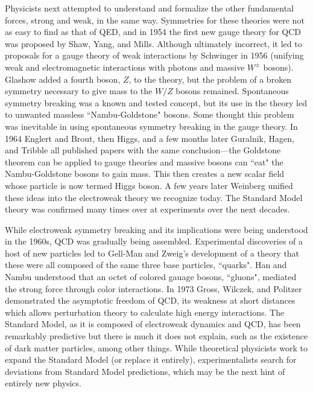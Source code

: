Physicists next attempted to understand and formalize the other fundamental forces, strong and weak, in the same way. Symmetries for these theories were not as easy to find as that of QED, and in 1954 the first new gauge theory for QCD was proposed by Shaw, Yang, and Mills. Although ultimately incorrect, it led to proposals for a gauge theory of weak interactions by Schwinger in 1956 (unifying weak and electromagnetic interactions with photons and massive $W^\pm$ bosons). Glashow added a fourth boson, $Z$, to the theory, but the problem of a broken symmetry necessary to give mass to the $W/Z$ bosons remained. Spontaneous symmetry breaking was a known and tested concept, but its use in the theory led to unwanted massless ``Nambu-Goldstone" bosons. Some thought this problem was inevitable in using spontaneous symmetry breaking in the gauge theory. In 1964 Englert and Brout, then Higgs, and a few months later Guralnik, Hagen, and Tribble all published papers with the same conclusion---the Goldstone theorem can be applied to gauge theories and massive bosons can ``eat" the Nambu-Goldstone bosons to gain mass. This then creates a new scalar field whose particle is now termed Higgs boson. A few years later Weinberg unified these ideas into the electroweak theory we recognize today. The Standard Model theory was confirmed many times over at experiments over the next decades. 

While electroweak symmetry breaking and its implications were being understood in the 1960s, QCD was gradually being assembled. Experimental discoveries of a host of new particles led to Gell-Man and Zweig's development of a theory that these were all composed of the same three base particles, ``quarks". Han and Nambu understood that an octet of colored gauage bosons, ``gluons", mediated the strong force through color interactions. In 1973 Gross, Wilczek, and Politzer demonstrated the asymptotic freedom of QCD, its weakness at short distances which allows perturbation theory to calculate high energy interactions. The Standard Model, as it is composed of electroweak dynamics and QCD, has been remarkably predictive but there is much it does not explain, such as the existence of dark matter particles, among other things. While theoretical physicists work to expand the Standard Model (or replace it entirely), experimentalists search for deviations from Standard Model predictions, which may be the next hint of entirely new physics. 

